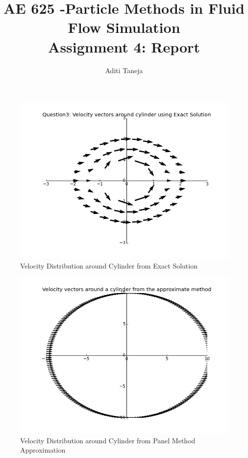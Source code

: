 \documentclass{article}
\title{AE 625 -Particle Methods in Fluid Flow Simulation \\ Assignment 4: Report }
\author{Aditi Taneja}
\date{}
\begin{document}
\maketitle

\begin{figure}[H]   \label{figure}
\includegraphics[width=12cm]{velocity_plot_exact.png}
\caption{Velocity Distribution around Cylinder from Exact Solution}
\label{figure:}
\end{figure}

\begin{figure}[H] \label{figure}
\includegraphics[width=12cm]{approx_q1.png}
\caption{Velocity Distribution around Cylinder from Panel Method Approximation}
\label{figure:}
\end{figure}
\end{document}
